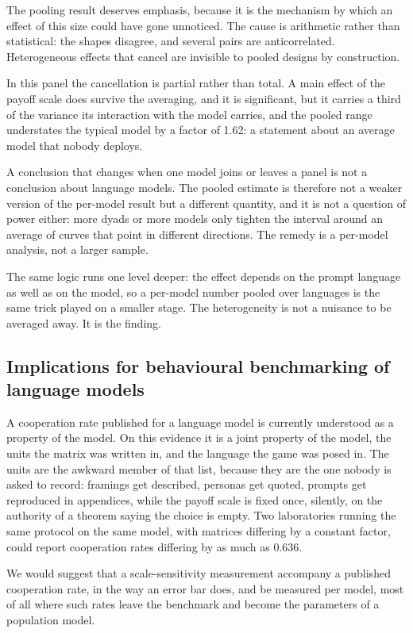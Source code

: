 \documentclass[11pt,a4paper]{article}
\begin{document}
The pooling result deserves emphasis, because it is the mechanism by which an
effect of this size could have gone unnoticed. The cause is arithmetic rather
than statistical: the shapes disagree, and several pairs are anticorrelated.
Heterogeneous effects that cancel are invisible to pooled designs by
construction.

In this panel the cancellation is partial rather than total. A main effect of
the payoff scale does survive the averaging, and it is significant, but it
carries a third of the variance its interaction with the model carries, and the
pooled range understates the typical model by a factor of 1.62: a statement
about an average model that nobody deploys.

A conclusion that changes when one model joins or leaves a panel is not a
conclusion about language models. The pooled estimate is therefore not a weaker
version of the per-model result but a different quantity, and it is not a
question of power either: more dyads or more models only tighten the interval
around an average of curves that point in different directions. The remedy is a
per-model analysis, not a larger sample.

The same logic runs one level deeper: the effect depends on the prompt language
as well as on the model, so a per-model number pooled over languages is the same
trick played on a smaller stage. The heterogeneity is not a nuisance to be
averaged away. It is the finding.

\subsection{Implications for behavioural benchmarking of language models}

A cooperation rate published for a language model is currently understood as a
property of the model. On this evidence it is a joint property of the model, the
units the matrix was written in, and the language the game was posed in. The
units are the awkward member of that list, because they are the one nobody is
asked to record: framings get described, personas get quoted, prompts get
reproduced in appendices, while the payoff scale is fixed once, silently, on the
authority of a theorem saying the choice is empty. Two laboratories running the
same protocol on the same model, with matrices differing by a constant factor,
could report cooperation rates differing by as much as 0.636.

We would suggest that a scale-sensitivity measurement accompany a published
cooperation rate, in the way an error bar does, and be measured per model,
most of all where such rates leave the benchmark and become the parameters of a
population model.
\end{document}
